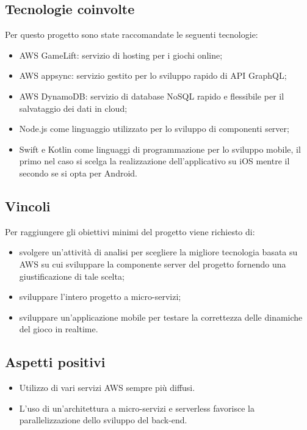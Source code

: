 \subsection{Tecnologie coinvolte}
Per questo progetto sono state raccomandate le seguenti tecnologie:
\begin{itemize}
	\item AWS GameLift: servizio di hosting per i giochi online;
	\item AWS appsync: servizio gestito per lo sviluppo rapido di API GraphQL;
	\item AWS DynamoDB: servizio di database NoSQL rapido e flessibile per il salvataggio dei dati in cloud;
	\item Node.js come linguaggio utilizzato per lo sviluppo di componenti server;
	\item Swift e Kotlin come linguaggi di programmazione per lo sviluppo mobile, il primo nel caso si scelga la realizzazione dell'applicativo su iOS mentre il secondo se si opta per Android.
\end{itemize}

\subsection{Vincoli}
Per raggiungere gli obiettivi minimi del progetto viene richiesto di:
\begin{itemize}
	\item svolgere un'attività di analisi per scegliere la migliore tecnologia basata su AWS su cui sviluppare la componente server del progetto fornendo una giustificazione di tale scelta;
	\item sviluppare l'intero progetto a micro-servizi;
	\item sviluppare un'applicazione mobile per testare la correttezza delle dinamiche del gioco in realtime.
\end{itemize}

 \subsection{Aspetti positivi}
\begin{itemize}
	\item Utilizzo di vari servizi AWS sempre più diffusi.
	\item L'uso di un'architettura a micro-servizi e serverless favorisce la parallelizzazione dello sviluppo del back-end.
\end{itemize}

